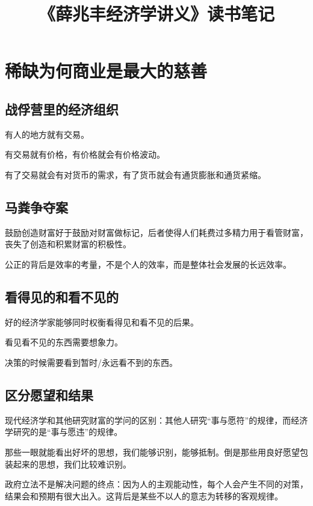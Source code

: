 \documentclass[12pt]{ctexart}
\title{《薛兆丰经济学讲义》读书笔记}
\date{}
\begin{document}
\maketitle
\section{稀缺\quad 为何商业是最大的慈善}
\subsection{战俘营里的经济组织}
有人的地方就有交易。

有交易就有价格，有价格就会有价格波动。

有了交易就会有对货币的需求，有了货币就会有通货膨胀和通货紧缩。
\subsection{马粪争夺案}
鼓励创造财富好于鼓励对财富做标记，后者使得人们耗费过多精力用于看管财富，丧失了创造和积累财富的积极性。

公正的背后是效率的考量，不是个人的效率，而是整体社会发展的长远效率。
\subsection{看得见的和看不见的}
好的经济学家能够同时权衡看得见和看不见的后果。

看见看不见的东西需要想象力。

决策的时候需要看到暂时/永远看不到的东西。
\subsection{区分愿望和结果}
现代经济学和其他研究财富的学问的区别：其他人研究“事与愿符”的规律，而经济学研究的是“事与愿违”的规律。

那些一眼就能看出好坏的思想，我们能够识别，能够抵制。倒是那些用良好愿望包装起来的思想，我们比较难识别。

政府立法不是解决问题的终点：因为人的主观能动性，每个人会产生不同的对策，结果会和预期有很大出入。这背后是某些不以人的意志为转移的客观规律。
\section{}
\end{document}
